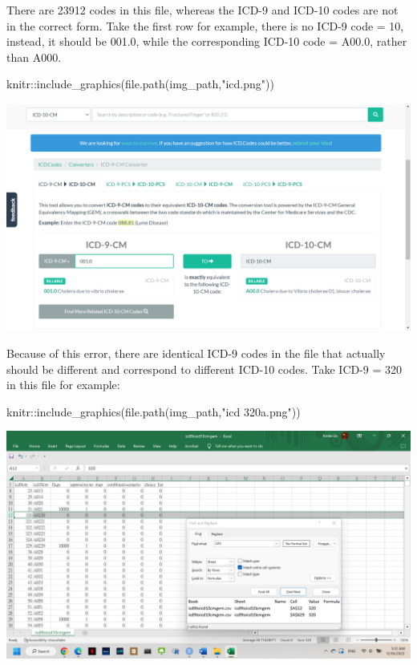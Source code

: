 \documentclass[
]{article}
\newenvironment{Shaded}{\begin{snugshade}}{\end{snugshade}}
\newcommand{\FunctionTok}[1]{\textcolor[rgb]{0.00,0.00,0.00}{#1}}
\newcommand{\NormalTok}[1]{#1}
\newcommand{\SpecialCharTok}[1]{\textcolor[rgb]{0.00,0.00,0.00}{#1}}
\newcommand{\StringTok}[1]{\textcolor[rgb]{0.31,0.60,0.02}{#1}}
\begin{document}
There are 23912 codes in this file, whereas the ICD-9 and ICD-10 codes
are not in the correct form. Take the first row for example, there is no
ICD-9 code = 10, instead, it should be 001.0, while the corresponding
ICD-10 code = A00.0, rather than A000.

\begin{Shaded}
\begin{Highlighting}[]
\NormalTok{knitr}\SpecialCharTok{::}\FunctionTok{include\_graphics}\NormalTok{(}\FunctionTok{file.path}\NormalTok{(img\_path,}\StringTok{"icd.png"}\NormalTok{))}
\end{Highlighting}
\end{Shaded}

\includegraphics[width=26.67in]{img/icd}

Because of this error, there are identical ICD-9 codes in the file that
actually should be different and correspond to different ICD-10 codes.
Take ICD-9 = 320 in this file for example:

\begin{Shaded}
\begin{Highlighting}[]
\NormalTok{knitr}\SpecialCharTok{::}\FunctionTok{include\_graphics}\NormalTok{(}\FunctionTok{file.path}\NormalTok{(img\_path,}\StringTok{"icd 320a.png"}\NormalTok{))}
\end{Highlighting}
\end{Shaded}

\includegraphics[width=26.67in]{img/icd 320a}
\end{document}
